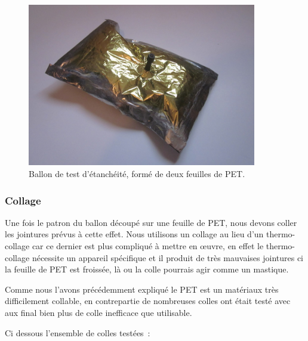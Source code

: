 \documentclass[a4paper,11pt]{article}
\begin{document}
\begin{figure}[H]
 \centering
 \includegraphics[width=10cm]{../Images/ballon_etanche.JPG}
 \caption{Ballon de test d'étanchéité, formé de deux feuilles de PET.}
\end{figure}


\subsubsection{Collage}

Une fois le patron du ballon découpé sur une feuille de PET, nous devons coller les jointures prévus à cette effet. Nous utilisons un collage au lieu d'un thermo-collage car ce dernier est plus compliqué à mettre en œuvre, en effet le thermo-collage nécessite un appareil spécifique et il produit de très mauvaises jointures ci la feuille de PET est froissée, là ou la colle pourrais agir comme un mastique.

Comme nous l'avons précédemment expliqué le PET est un matériaux très difficilement collable, en contrepartie de nombreuses colles ont était testé avec aux final bien plus de colle inefficace que utilisable. 

Ci dessous l'ensemble de colles testées~:
\end{document}
